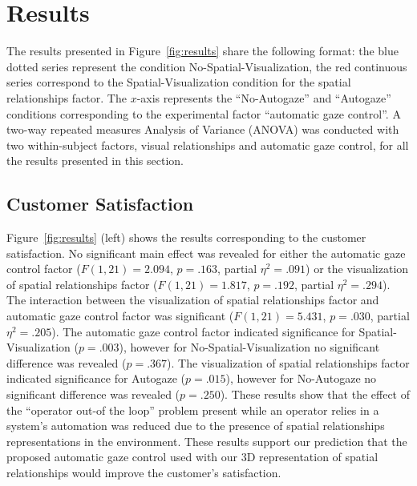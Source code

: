 \documentclass[a4paper, 10pt, conference]{ieeeconf}     %
\begin{document}
\section{Results}
\label{sec:verification}
The results presented in Figure~\ref{fig:results} share the following format: the blue dotted series represent the condition No-Spatial-Visualization, the red continuous series correspond to the Spatial-Visualization condition for the spatial relationships factor. 
The $x$-axis represents the ``No-Autogaze'' and ``Autogaze'' conditions corresponding to the experimental factor ``automatic gaze control''. 
A two-way repeated measures Analysis of Variance (ANOVA) was conducted with two within-subject factors, visual relationships and automatic gaze control, for all the results presented in this section. 

\subsection{Customer Satisfaction}
Figure~\ref{fig:results} (left) shows the results corresponding to the customer satisfaction.
No significant main effect was revealed for either the automatic gaze control factor ($F(1,21)=2.094$, $p=.163$, partial $\eta^2=.091$) or the visualization of spatial relationships factor ($F(1,21)=1.817$, $p=.192$, partial $\eta^2=.294$).
The interaction between the visualization of spatial relationships factor and automatic gaze control factor was significant ($F(1,21)=5.431$, $p=.030$, partial $\eta^2=.205$).
The automatic gaze control factor indicated significance for Spatial-Visualization ($p=.003$), however for No-Spatial-Visualization no significant difference was revealed ($p=.367$).
The visualization of spatial relationships factor indicated significance for Autogaze ($p=.015$), however for No-Autogaze no significant difference was revealed ($p=.250$).
These results show that the effect of the ``operator out-of the loop'' problem present while an operator relies in a system's automation was reduced due to the presence of spatial relationships representations in the environment.
These results support our prediction that the proposed automatic gaze control used with our 3D representation of spatial relationships would improve the customer's satisfaction.
\end{document}
